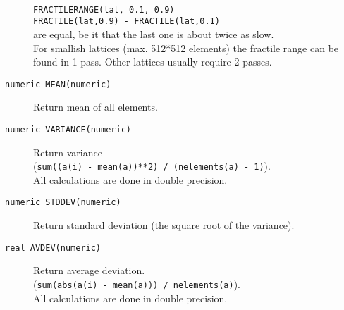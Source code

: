 \begin{description}
    \\\texttt{FRACTILERANGE(lat, 0.1, 0.9)}
    \\\texttt{FRACTILE(lat,0.9) - FRACTILE(lat,0.1)}
    \\are equal, be it that the last one is about twice as slow.
    \\For smallish lattices (max. 512*512 elements) the fractile range
    can be found in 1 pass. Other lattices usually require 2 passes.
  \item[ \texttt{numeric MEAN(numeric)}]
    Return mean of all elements.
  \item[ \texttt{numeric VARIANCE(numeric)}]
    Return variance
    \\(\texttt{sum((a(i) - mean(a))**2) / (nelements(a) - 1)}).
    \\All calculations are done in double precision.
  \item[ \texttt{numeric STDDEV(numeric)}]
    Return standard deviation (the square root of the variance).
  \item[ \texttt{real AVDEV(numeric)}]
    Return average deviation.
    \\(\texttt{sum(abs(a(i) - mean(a))) / nelements(a)}).
    \\All calculations are done in double precision.
\end{description}

